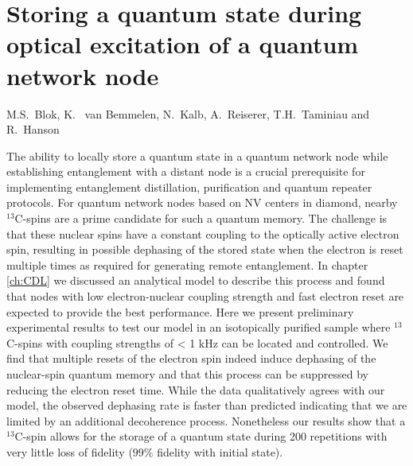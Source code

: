 \graphicspath{{./ch_carbon_dephasing_purified/figures/}}


\chapter{Storing a quantum state during optical excitation of a quantum network node}
\label{ch:CDP}

\begin{center} 
    \vspace{-1cm} {M.S.~Blok, K. ~van Bemmelen, N.~Kalb, A.~Reiserer, T.H.~Taminiau and R.~Hanson} 
\end{center}

\vspace{0.5cm} 

The ability to locally store a quantum state in a quantum network node while establishing entanglement with a distant node is a crucial prerequisite for implementing entanglement distillation, purification and quantum repeater protocols\cite{Bennett_Phys.Rev.Lett._1996,Campbell_Phys.Rev.Lett._2008,Briegel_Phys.Rev.Lett._1998,Childress_Phys.Rev.Lett._2006}. For quantum network nodes based on NV centers in diamond, nearby $^{13}$C-spins are a prime candidate for such a quantum memory. The challenge is that these nuclear spins have a constant coupling to the optically active electron spin, resulting in possible dephasing of the stored state when the electron is reset multiple times as required for generating remote entanglement. In chapter \ref{ch:CDL} we discussed an analytical model to describe this process and found that nodes with low electron-nuclear coupling strength and fast electron reset are expected to provide the best performance. Here we present preliminary experimental results to test our model in an isotopically purified sample where $^{13}$C-spins with coupling strengths of < 1 kHz can be located and controlled. We find that multiple resets of the electron spin indeed induce dephasing of the nuclear-spin quantum memory and that this process can be suppressed by reducing the electron reset time. While the data qualitatively agrees with our model, the observed dephasing rate is faster than predicted indicating that we are limited by an additional decoherence process. Nonetheless our results show that a $^{13}$C-spin allows for the storage of a quantum state during 200 repetitions with very little loss of fidelity ($99 \%$ fidelity with initial state).
\clearpage

